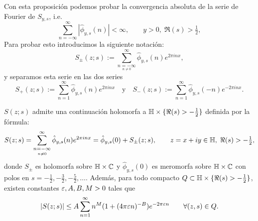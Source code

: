 \documentclass[../../tesis_maestria]{subfiles}
\begin{document}
Con esta proposici\'on podemos probar la convergencia absoluta de la serie
de Fourier de $S_{y,s}$, i.e.
\[
  \sum_{n=-\infty}^{\infty}|\hat{\phi}_{y,s}(n)|<\infty,\qquad y>0,\; \Re(s)>\tfrac{1}{2},
\]
Para probar esto introducimos la siguiente notaci\'on:
\[
  S_{\pm}(z;s):=\sum_{\underset{n\neq0}{n=-\infty}}^{\infty}\hat{\phi}_{y,s}(n)e^{2\pi inx},
\]
y separamos esta serie en las dos series
\[
  S_+(z;s):=\sum_{n=1}^{\infty}\hat{\phi}_{y,s}(n)e^{2\pi inx}\quad\text{y}\quad
  S_-(z;s):=\sum_{n=1}^{\infty}\hat{\phi}_{y,s}(-n)e^{-2\pi inx}.
\]


\begin{cor}\label{thm:S_holomorfo_gen}%
  $S(z;s)$ admite una continuaci\'on holomorfa a $\mathbb{H}\times\{\Re(s)>-\tfrac{1}{2}\}$
  definida por la f\'ormula:
  \begin{equation}\label{eq:exp_fourier_S}
    S(z;s)
    =\sum_{\underset{n\neq0}{n=-\infty}}^{\infty}\hat{\phi}_{y,s}(n)e^{2\pi inx}
    =\hat{\phi}_{y,s}(0)+S_{\pm}(z;s),
    \qquad z=x+iy\in\mathbb{H},\; \Re(s)>-\tfrac{1}{2},
  \end{equation}
  donde $S_{\pm}$ es holomorfa sobre $\mathbb{H}\times\mathbb{C}$ y $\hat{\phi}_{y,s}(0)$ es
  meromorfa sobre $\mathbb{H}\times\mathbb{C}$ con polos en $s=-\tfrac{1}{2},-\tfrac{3}{2},-\tfrac{5}{2},\ldots$.
  Adem\'as, para todo compacto $Q\subset\mathbb{H}\times\{\Re(s)>-\tfrac{1}{2}\}$,
  existen constantes $\varepsilon,A,B,M>0$ tales que
  \[
    |S(z;s)|\leq A\sum_{n=1}^{\infty}n^M(1+(4\pi\varepsilon n)^{-B})e^{-2\pi\varepsilon n}
    \qquad\forall(z,s)\in Q.
  \]
\end{cor}%
\end{document}
